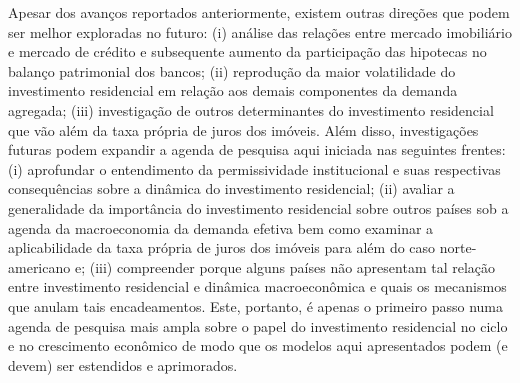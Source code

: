 
Apesar dos avanços reportados anteriormente, existem outras direções que podem ser melhor exploradas no futuro: (i) análise das relações entre mercado imobiliário e mercado de crédito e subsequente aumento da participação das hipotecas no balanço patrimonial dos bancos; (ii) reprodução da maior volatilidade do investimento residencial em relação aos demais componentes da demanda agregada; (iii) investigação de outros determinantes do investimento residencial que vão além da taxa própria de juros dos imóveis.
Além disso, investigações futuras podem expandir a agenda de pesquisa aqui iniciada nas seguintes frentes:
	(i) aprofundar o entendimento da permissividade institucional e suas respectivas consequências sobre a dinâmica do investimento residencial; 
	(ii) avaliar a generalidade da importância do investimento residencial sobre outros países sob a agenda da macroeconomia da demanda efetiva bem como examinar a aplicabilidade da taxa própria de juros dos imóveis para além do caso norte-americano e;
	(iii) compreender porque alguns países não apresentam tal relação entre investimento residencial e dinâmica macroeconômica e quais os mecanismos que anulam tais encadeamentos.
Este, portanto, é apenas o primeiro passo numa agenda de pesquisa mais ampla sobre o papel do investimento residencial no ciclo e no crescimento econômico de modo que os modelos aqui apresentados podem (e devem) ser estendidos e aprimorados.